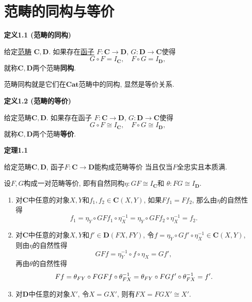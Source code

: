 \documentclass[UTF8]{ctexart}
\begin{document}
\setlength{\abovedisplayskip}{1pt}
\setlength{\belowdisplayskip}{1pt}

\section{范畴的同构与等价}

\hypertarget{sec:定义1.1}{}
\noindent\textbf{定义1.1 (范畴的同构)}

给定\href{01 范畴#nameddest=sec:定义1.1}{范畴}
$\mathbf{C},\mathbf{D}$. 如果存在\href{02 函子#nameddest=sec:定义1.1}{函子}
$F:\mathbf{C}\to\mathbf{D},\,G:\mathbf{D}\to\mathbf{C}$使得
\[
    G\circ F=I_{\mathbf{C}},\quad F\circ G=I_{\mathbf{D}},
\]
就称$\mathbf{C},\mathbf{D}$两个范畴\textbf{同构}.

\vspace{10pt}

范畴同构就是它们在$\mathbf{Cat}$范畴中的同构, 显然是等价关系.

\vspace{10pt}

\hypertarget{sec:定义1.2}{}
\noindent\textbf{定义1.2 (范畴的等价)}

给定范畴$\mathbf{C},\mathbf{D}$. 如果存在函子
$F:\mathbf{C}\to\mathbf{D},\,G:\mathbf{D}\to\mathbf{C}$使得
\[
    G\circ F\cong I_{\mathbf{C}},\quad F\circ G\cong I_{\mathbf{D}},
\]
就称$\mathbf{C},\mathbf{D}$两个范畴\textbf{等价}.

\vspace{10pt}

\hypertarget{sec:定理1.1}{}
\noindent\textbf{定理1.1}

给定范畴$\mathbf{C},\mathbf{D}$, 函子$F:\mathbf{C}\to\mathbf{D}$能构成范畴等价
当且仅当$F$全忠实且本质满.



设$F,G$构成一对范畴等价, 即有自然同构$\eta:GF\cong I_{\mathbf{C}}$和
$\theta:FG\cong I_{\mathbf{D}}$.

\begin{enumerate}
    \item 对$\mathbf{C}$中任意的对象$X,Y$和$f_1,f_2\in\mathbf{C}(X,Y)$,
    如果$Ff_1=Ff_2$, 那么由$\eta$的自然性得
    \[
        f_1=\eta_Y\circ GFf_1\circ\eta_X^{-1}=\eta_Y\circ GFf_2\circ\eta_X^{-1}=f_2.
    \]
    \item 对$\mathbf{C}$中任意的对象$X,Y$和$f'\in\mathbf{D}(FX,FY)$,
    令$f=\eta_Y\circ Gf'\circ\eta_X^{-1}\in\mathbf{C}(X,Y)$, 则由$\eta$的自然性得
    \[
        GFf=\eta_Y^{-1}\circ f\circ\eta_X=Gf',
    \]
    再由$\theta$的自然性得
    \vspace{-3pt}
    \[
        Ff=\theta_{FY}\circ FGFf\circ\theta_{FX}^{-1}=
        \theta_{FY}\circ FGf'\circ\theta_{FX}^{-1}=f'.\\[-3pt]
    \]
    \item 对$\mathbf{D}$中任意的对象$X'$, 令$X=GX'$, 则有$FX=FGX'\cong X'$.
\end{enumerate}
\end{document}

